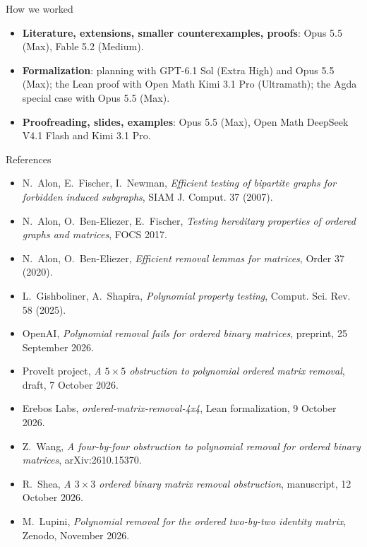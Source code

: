 \documentclass[aspectratio=169,11pt,t]{beamer}
\begin{document}
\begin{frame}{How we worked}
\small
\begin{itemize}
\item \textbf{Literature, extensions, smaller counterexamples, proofs}: Opus 5.5 (Max), Fable 5.2 (Medium).
\item \textbf{Formalization}: planning with GPT-6.1 Sol (Extra High) and Opus 5.5 (Max); the Lean proof with Open Math Kimi 3.1 Pro (Ultramath); the Agda special case with Opus 5.5 (Max).
\item \textbf{Proofreading, slides, examples}: Opus 5.5 (Max), Open Math DeepSeek V4.1 Flash and Kimi 3.1 Pro.
\end{itemize}
\end{frame}

\begin{frame}{References}
\scriptsize
\begin{itemize}
\item N.~Alon, E.~Fischer, I.~Newman, \emph{Efficient testing of bipartite graphs for forbidden induced subgraphs}, SIAM J. Comput. 37 (2007).
\item N.~Alon, O.~Ben-Eliezer, E.~Fischer, \emph{Testing hereditary properties of ordered graphs and matrices}, FOCS 2017.
\item N.~Alon, O.~Ben-Eliezer, \emph{Efficient removal lemmas for matrices}, Order 37 (2020).
\item L.~Gishboliner, A.~Shapira, \emph{Polynomial property testing}, Comput. Sci. Rev. 58 (2025).
\item OpenAI, \emph{Polynomial removal fails for ordered binary matrices}, preprint, 25 September 2026.
\item ProveIt project, \emph{A $5\times5$ obstruction to polynomial ordered matrix removal}, draft, 7 October 2026.
\item Erebos Labs, \emph{ordered-matrix-removal-4x4}, Lean formalization, 9 October 2026.
\item Z.~Wang, \emph{A four-by-four obstruction to polynomial removal for ordered binary matrices}, arXiv:2610.15370.
\item R.~Shea, \emph{A $3\times3$ ordered binary matrix removal obstruction}, manuscript, 12 October 2026.
\item M.~Lupini, \emph{Polynomial removal for the ordered two-by-two identity matrix}, Zenodo, November 2026.
\end{itemize}
\end{frame}
\end{document}
